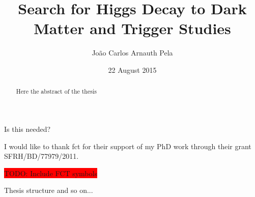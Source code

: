 \documentclass[hyperpdf]{hepthesis}
\title{Search for Higgs Decay to Dark Matter and Trigger Studies}
\author{João Carlos Arnauth Pela}
\date{22 August 2015}
\begin{document}
\begin{frontmatter}

  
\begin{abstract}
Here the abstract of the thesis
\end{abstract}

\begin{declaration}
Is this needed?
\end{declaration}

\begin{acknowledgements}
I would like to thank \gls{fct} for their support of my PhD work through their grant SFRH/BD/77979/2011. 

\colorbox{red}{TODO: Include FCT symbols}

\end{acknowledgements}

\begin{preface}
Thesis structure and so on...
\end{preface}

\dedication{To my grand mother}

\tableofcontents

  
\end{frontmatter}

\begin{mainmatter}

  
  
  
  
  
  

\end{mainmatter}

\begin{backmatter}



\end{backmatter}
\end{document}
